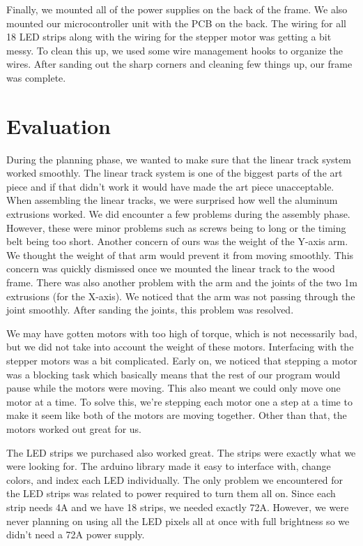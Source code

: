 \documentclass[11pt]{IEEEtran}
\begin{document}
Finally, we mounted all of the power supplies on the back of the frame. We also mounted our microcontroller unit with the PCB on the back. The wiring for all 18 LED strips along with the wiring for the stepper motor was getting a bit messy. To clean this up, we used some wire management hooks to organize the wires. After sanding out the sharp corners and cleaning few things up, our frame was complete.

\section{Evaluation}
During the planning phase, we wanted to make sure that the linear track system worked smoothly. The linear track system is one of the biggest parts of the art piece and if that didn’t work it would have made the art piece unacceptable. When assembling the linear tracks, we were surprised how well the aluminum extrusions worked. We did encounter a few problems during the assembly phase. However, these were minor problems such as screws being to long or the timing belt being too short. Another concern of ours was the weight of the Y-axis arm. We thought the weight of that arm would prevent it from moving smoothly. This concern was quickly dismissed once we mounted the linear track to the wood frame. There was also another problem with the arm and the joints of the two 1m extrusions (for the X-axis). We noticed that the arm was not passing through the joint smoothly. After sanding the joints, this problem was resolved. 

We may have gotten motors with too high of torque, which is not necessarily bad, but we did not take into account the weight of these motors. Interfacing with the stepper motors was a bit complicated. Early on, we noticed that stepping a motor was a blocking task which basically means that the rest of our program would pause while the motors were moving. This also meant we could only move one motor at a time. To solve this, we’re stepping each motor one a step at a time to make it seem like both of the motors are moving together. Other than that, the motors worked out great for us.

The LED strips we purchased also worked great. The strips were exactly what we were looking for. The arduino library made it easy to interface with, change colors, and index each LED individually. The only problem we encountered for the LED strips was related to power required to turn them all on. Since each strip needs 4A and we have 18 strips, we needed exactly 72A. However, we were never planning on using all the LED pixels all at once with full brightness so we didn’t need a 72A power supply.
\end{document}
